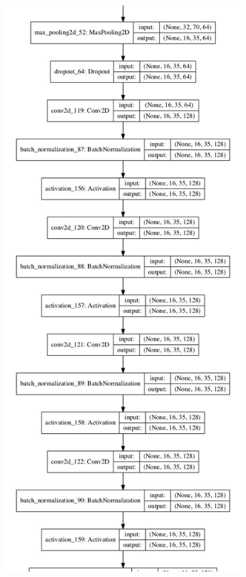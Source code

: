 \begin{figure}[htbp]
\centering
     \begin{subfigure}[b]{0.45\linewidth}
      \includegraphics[scale=0.35]{Figs/Appen/model_plot2.png}

\end{subfigure}
\end{figure}
